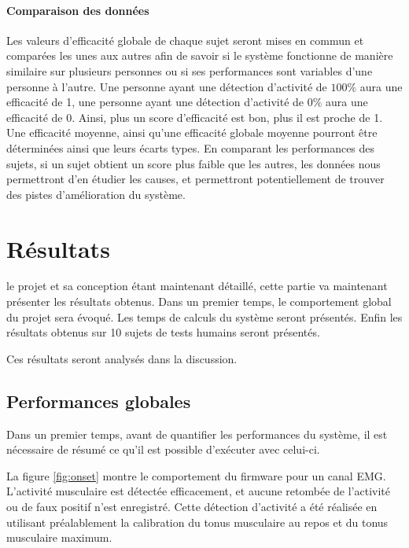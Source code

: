 \documentclass[letterpaper, twoside, 12pt, memoire, creativecommons, hyperref]{thETS}
\begin{document}
\subsubsection{Comparaison des données}

Les valeurs d’efficacité globale de chaque sujet seront mises en commun et comparées les unes aux autres afin de savoir si le système fonctionne de manière similaire sur plusieurs personnes ou si ses performances sont variables d’une personne à l’autre.
Une personne ayant une détection d’activité de $100\%$ aura une efficacité de 1, une personne ayant une détection d’activité de $0\%$ aura une efficacité de 0. Ainsi, plus un score d’efficacité est bon, plus il est proche de 1.
Une efficacité moyenne, ainsi qu’une efficacité globale moyenne pourront être déterminées ainsi que leurs écarts types. En comparant les performances des sujets, si un sujet obtient un score plus faible que les autres, les données nous permettront d’en étudier les causes, et permettront potentiellement de trouver des pistes d’amélioration du système.

\chapter{Résultats}

le projet et sa conception étant maintenant détaillé, cette partie va maintenant présenter les résultats obtenus. Dans un premier temps, le comportement global du projet sera évoqué. Les temps de calculs du système seront présentés. Enfin les résultats obtenus sur 10 sujets de tests humains seront présentés. 

Ces résultats seront analysés dans la discussion.

\section{Performances globales}

Dans un premier temps, avant de quantifier les performances du système, il est nécessaire de résumé ce qu'il est possible d'exécuter avec celui-ci. 

La figure \ref{fig:onset} montre le comportement du firmware pour un canal EMG. L'activité musculaire est détectée efficacement, et aucune retombée de l'activité ou de faux positif n'est enregistré. Cette détection d'activité a été réalisée en utilisant préalablement la calibration du tonus musculaire au repos et du tonus musculaire maximum. 
\end{document}
